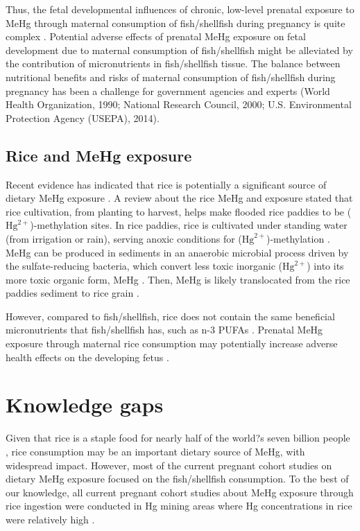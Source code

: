 Thus, the fetal developmental influences of chronic, low-level prenatal exposure to MeHg through maternal consumption of fish/shellfish during pregnancy is quite complex \cite{rice2004us,cohen2005quantitative}. Potential adverse effects of prenatal MeHg exposure on fetal development due to maternal consumption of fish/shellfish might be alleviated by the contribution of micronutrients in fish/shellfish tissue. The balance between nutritional benefits and risks of maternal consumption of fish/shellfish during pregnancy has been a challenge for government agencies and experts (World Health Organization, 1990; National Research Council, 2000; U.S. Environmental Protection Agency (USEPA), 2014). 

\subsection{Rice and MeHg exposure}

Recent evidence has indicated that rice is potentially a significant source of dietary MeHg exposure \cite{li2010methylmercury,rothenberg2014rice}. A review about the rice MeHg and exposure \cite{rothenberg2014rice} stated that rice cultivation, from planting to harvest, helps make flooded rice paddies to be  (\(\text{Hg}^{2+}\))-methylation sites. In rice paddies, rice is cultivated under standing water (from irrigation or rain), serving anoxic conditions for (\(\text{Hg}^{2+}\))-methylation \cite{rothenberg2014rice}. MeHg can be produced in sediments in an anaerobic microbial process driven by the sulfate-reducing bacteria, which convert less toxic inorganic  (\(\text{Hg}^{2+}\)) into its more toxic organic form, MeHg \cite{rothenberg2014rice}. Then, MeHg is likely translocated from the rice paddies sediment to rice grain \cite{rothenberg2014rice}. 

However, compared to fish/shellfish, rice does not contain the same beneficial micronutrients that fish/shellfish has, such as n-3 PUFAs \cite{rothenberg2011low}. Prenatal MeHg exposure through maternal rice consumption may potentially increase adverse health effects on the developing fetus \cite{rothenberg2011low}.

\section{Knowledge gaps}

Given that rice is a staple food for nearly half of the world?s seven billion people \cite{mohanty2013trends}, rice consumption may be an important dietary source of MeHg, with widespread impact. However, most of the current pregnant cohort studies on dietary MeHg exposure focused on the fish/shellfish consumption. To the best of our knowledge, all current pregnant cohort studies about MeHg exposure through rice ingestion were conducted in Hg mining areas where Hg concentrations in rice were relatively high \cite{morishita1982mercury,rothenberg2013prenatal}. 

